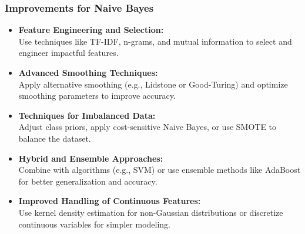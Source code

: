 	\begin{frame}
		\frametitle{Improvements for Naive Bayes}
		
		\begin{itemize}
			\item \textbf{Feature Engineering and Selection:} \\
			Use techniques like TF-IDF, n-grams, and mutual information to select and engineer impactful features.
			
			\item \textbf{Advanced Smoothing Techniques:} \\
			Apply alternative smoothing (e.g., Lidstone or Good-Turing) and optimize smoothing parameters to improve accuracy.
			
			\item \textbf{Techniques for Imbalanced Data:} \\
			Adjust class priors, apply cost-sensitive Naive Bayes, or use SMOTE to balance the dataset.
			
			\item \textbf{Hybrid and Ensemble Approaches:} \\
			Combine with algorithms (e.g., SVM) or use ensemble methods like AdaBoost for better generalization and accuracy.
			
			\item \textbf{Improved Handling of Continuous Features:} \\
			Use kernel density estimation for non-Gaussian distributions or discretize continuous variables for simpler modeling.
		\end{itemize}
		
	\end{frame}
	




